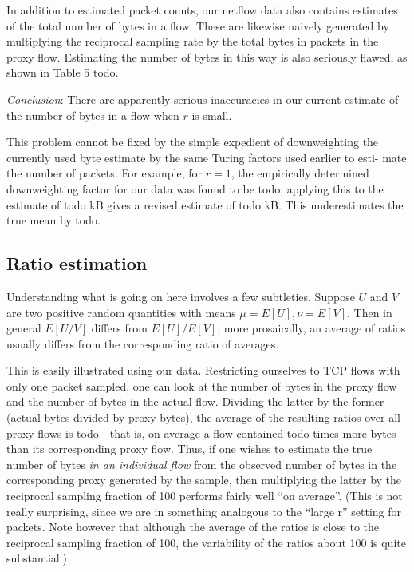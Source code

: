 \documentclass{paper}
\begin{document}
In addition to estimated packet counts, our netflow data also contains
estimates of the total number of bytes in a flow. These are likewise naively
generated by multiplying the reciprocal sampling rate by the total bytes in
packets in the proxy flow. Estimating the number of bytes in this way is also
seriously flawed, as shown in Table 5 todo.

\emph{Conclusion}: There are apparently serious inaccuracies in our current
estimate of the number of bytes in a flow when $r$ is small.

This problem cannot be fixed by the simple expedient of downweighting the
currently used byte estimate by the same Turing factors used earlier to esti-
mate the number of packets. For example, for $r = 1$, the empirically
determined downweighting factor for our data was found to be todo; applying
this to the estimate of todo kB gives a revised estimate of todo kB. This
underestimates the true mean by todo.

\subsection{Ratio estimation}

Understanding what is going on here involves a few subtleties. Suppose $U$ and
$V$ are two positive random quantities with means $\mu = E[U], \nu = E[V]$.
Then in general $E[U/V]$ differs from $E[U]/E[V]$; more prosaically, an average
of ratios usually differs from the corresponding ratio of averages.

This is easily illustrated using our data. Restricting ourselves to TCP flows
with only one packet sampled, one can look at the number of bytes in the proxy
flow and the number of bytes in the actual flow. Dividing the latter by the
former (actual bytes divided by proxy bytes), the average of the resulting
ratios over all proxy flows is todo---that is, on average a flow contained todo
times more bytes than its corresponding proxy flow. Thus, if one wishes to
estimate the true number of bytes \emph{in an individual flow} from the
observed number of bytes in the corresponding proxy generated by the sample,
then multiplying the latter by the reciprocal sampling fraction of 100 performs
fairly well ``on average''. (This is not really surprising, since we are in
something analogous to the ``large r'' setting for packets. Note however that
although the average of the ratios is close to the reciprocal sampling fraction
of 100, the variability of the ratios about 100 is quite substantial.)
\end{document}
